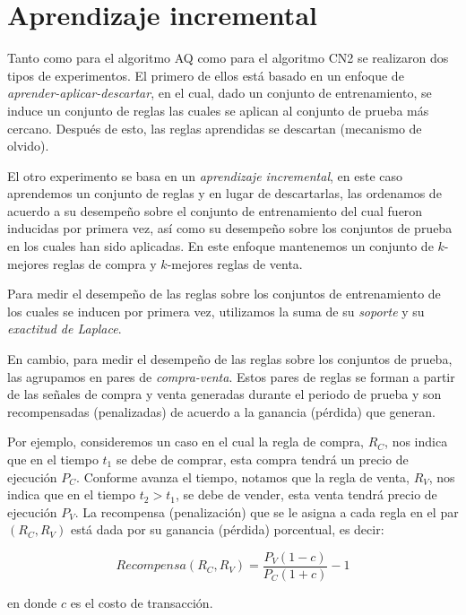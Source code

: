 \documentclass[12pt]{scrbook}
\theoremstyle{break}
\theoremstyle{break}
\begin{document}
\section{Aprendizaje incremental}
\label{seccion:aprendizaje incremental}
Tanto como para el algoritmo AQ como para el algoritmo CN2 se realizaron dos tipos de experimentos. El primero de ellos está basado en un enfoque de \textit{aprender-aplicar-descartar}, en el cual, dado un conjunto de entrenamiento, se induce un conjunto de reglas las cuales se aplican al conjunto de prueba más cercano. Después de esto, las reglas aprendidas se descartan (mecanismo de olvido).

El otro experimento se basa en un \textit{aprendizaje incremental}, en este caso aprendemos un conjunto de reglas y en lugar de descartarlas, las ordenamos de acuerdo a su desempeño sobre el conjunto de entrenamiento del cual fueron inducidas por primera vez, así como su desempeño sobre los conjuntos de prueba en los cuales han sido aplicadas. En este enfoque mantenemos un conjunto de $k$-mejores reglas de compra y $k$-mejores reglas de venta.

Para medir el desempeño de las reglas sobre los conjuntos de entrenamiento de los cuales se inducen por primera vez, utilizamos la suma de su \textit{soporte} y su \textit{exactitud de Laplace}.

En cambio, para medir el desempeño de las reglas sobre los conjuntos de prueba, las agrupamos en pares de \textit{compra-venta}. Estos pares de reglas se forman a partir de las señales de compra y venta generadas durante el periodo de prueba y son recompensadas (penalizadas) de acuerdo a la ganancia (pérdida) que generan.

Por ejemplo, consideremos un caso en el cual la regla de compra, $R_{C}$, nos indica que en el tiempo $t_1$ se debe de comprar, esta compra tendrá un precio de ejecución $P_{C}$. Conforme avanza el tiempo, notamos que la regla de venta, $R_{V}$, nos indica que en el tiempo $t_2 > t_1$, se debe de vender, esta venta tendrá precio de ejecución $P_{V}$. La recompensa (penalización) que se le asigna a cada regla en el par $\left(R_C, R_V\right)$ está dada por su ganancia (pérdida) porcentual, es decir:

\begin{equation}\label{eqn:recompensa reglas}
Recompensa(R_C, R_V) = \dfrac{P_V (1 - c)}{P_C (1 + c) } - 1
\end{equation}

en donde $c$ es el costo de transacción.
\end{document}
